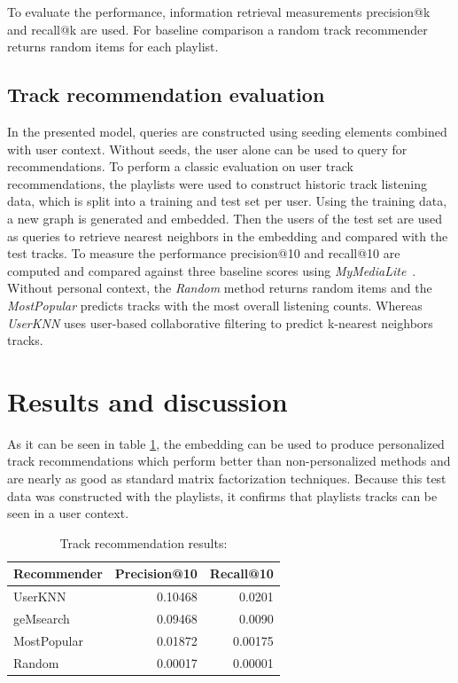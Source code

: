 \documentclass[sigconf]{acmart}
\begin{document}
To evaluate the performance, information retrieval measurements precision@k and recall@k are used. For baseline comparison a random track recommender returns random items for each playlist.



\subsection{Track recommendation evaluation}
\label{subsec:track_rec_eval}
In the presented model, queries are constructed using seeding elements combined with user context. Without seeds, the user alone can be used to query for recommendations. To perform a classic evaluation on user track recommendations, the playlists were used to construct historic track listening data, which is split into a training and test set per user. Using the training data, a new graph is generated and embedded. Then the users of the test set are used as queries to retrieve nearest neighbors in the embedding and compared with the test tracks. To measure the performance precision@10 and recall@10 are computed and compared against three baseline scores using \emph{MyMediaLite}~\cite{Gantner2011MyMediaLite}. Without personal context, the \emph{Random} method returns random items and the \emph{MostPopular} predicts tracks with the most overall listening counts. Whereas \emph{UserKNN} uses user-based collaborative filtering to predict k-nearest neighbors tracks. 


\section{Results and discussion}

As it can be seen in table \ref{table:track_rec_results}, the embedding can be used to produce personalized track recommendations which perform better than non-personalized methods and are nearly as good as standard matrix factorization techniques. Because this test data was constructed with the playlists, it confirms that playlists tracks can be seen in a user context.

\begin{table}[H]
	\caption{Track recommendation results:}
	\label{table:track_rec_results}
	\begin{tabular}{lrr}
		\midrule 
		\textbf{Recommender} & \textbf{Precision@10} & \textbf{Recall@10} \\ 
		\midrule 
		UserKNN   & 0.10468 & 0.0201  \\
		geMsearch   &  0.09468 &  0.0090  \\ %
		MostPopular   & 0.01872 & 0.00175  \\
		Random   & 0.00017 & 0.00001  \\
		\bottomrule
	\end{tabular}
\end{table}
\end{document}
